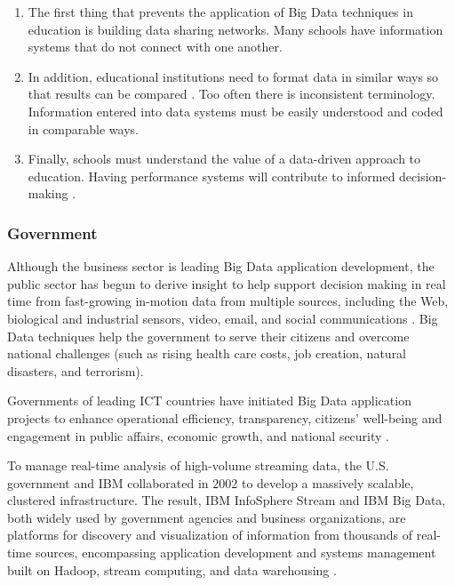 \documentclass[runningheads]{llncs}
\begin{document}
\begin{enumerate}

\item The first thing that prevents the application of Big Data techniques in education is building data sharing networks. Many schools have information systems that do not connect with one another.\\

\item In addition, educational institutions need to format data in similar ways so that results can be compared \cite{EDUCATIONALDM}. Too often there is inconsistent terminology. Information entered into data
systems must be easily understood and coded in comparable ways.\\

\item Finally, schools must understand the value of a data-driven approach to education. Having performance systems will contribute to informed decision-making \cite{EDREPORT}.

\end{enumerate}

\subsubsection{Government}

Although the business sector is leading Big Data application development, the public sector has begun to derive insight to help support decision making in real time from fast-growing in-motion data from multiple sources, including the Web, biological and industrial sensors, video, email, and social communications \cite{DOME}. Big Data techniques help the government to serve their citizens and overcome national challenges (such as rising health care costs, job creation, natural disasters, and terrorism). 

Governments of leading ICT countries have initiated Big Data application projects to enhance operational efficiency, transparency, citizens' well-being and engagement in public affairs, economic growth, and national security \cite{ACM}.

To manage real-time analysis of high-volume streaming data, the U.S. government and IBM collaborated in 2002 to develop a massively scalable, clustered infrastructure. The result, IBM InfoSphere Stream and IBM Big Data, both widely used by government agencies and business organizations, are platforms for discovery and visualization of information from thousands of real-time sources, encompassing application development and systems management built on Hadoop, stream computing, and data warehousing \cite{ACM}.
\end{document}
